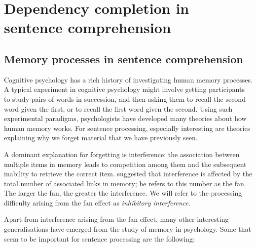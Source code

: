 \documentclass{cambridge7A}\usepackage[]{graphicx}\usepackage[]{color}
\begin{document}


\chapter{Dependency completion in sentence comprehension} \label{c01}

\section{Memory processes in sentence comprehension}

 
 Cognitive psychology has a rich history of investigating human memory processes. A typical experiment in cognitive psychology might involve getting participants to study pairs of words in succession, and then asking them to recall the second word given the first, or to recall the first word given the second.  Using such experimental paradigms, psychologists have  developed many   theories about how human memory works. For sentence processing, especially interesting are theories explaining why we forget material that we have previously seen.  
 
 A dominant explanation for forgetting is interference:  the association between multiple items in memory leads to competition among them and the subsequent inability to retrieve the correct item. \cite{anderson1974retrieval} suggested that interference is affected by the total number of associated links in memory; he refers to this number as the fan. The larger the fan, the greater the interference. We will refer to the processing difficulty arising from the  fan effect as  \textit{inhibitory interference}.
 
 
Apart from interference arising from the fan effect, many other interesting generalisations have emerged from the study of memory in psychology. Some that seem to be important for sentence processing are the following: 
 
\end{document}
